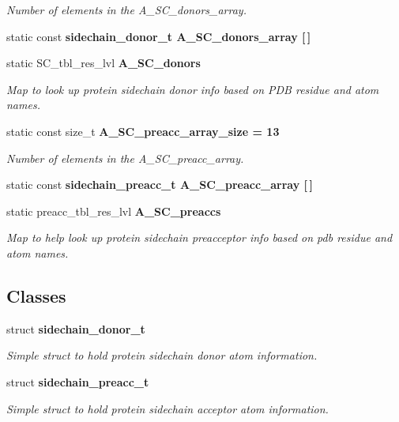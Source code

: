 \begin{CompactItemize}
\begin{CompactList}\small\item\em Number of elements in the A\_\-SC\_\-donors\_\-array. \item\end{CompactList}\item 
static const \bf{sidechain\_\-donor\_\-t} \textbf{A\_\-SC\_\-donors\_\-array} [$\,$]
\item 
static SC\_\-tbl\_\-res\_\-lvl \bf{A\_\-SC\_\-donors}\label{classASCbase_1_1HbondGeometry_41f1ae04adc06ecce1090fc0b29bdb6c}

\begin{CompactList}\small\item\em Map to look up protein sidechain donor info based on PDB residue and atom names. \item\end{CompactList}\item 
static const size\_\-t \bf{A\_\-SC\_\-preacc\_\-array\_\-size} = 13\label{classASCbase_1_1HbondGeometry_db54f5c38c13a2ba3a4e28b41ba8024c}

\begin{CompactList}\small\item\em Number of elements in the A\_\-SC\_\-preacc\_\-array. \item\end{CompactList}\item 
static const \bf{sidechain\_\-preacc\_\-t} \textbf{A\_\-SC\_\-preacc\_\-array} [$\,$]
\item 
static preacc\_\-tbl\_\-res\_\-lvl \bf{A\_\-SC\_\-preaccs}\label{classASCbase_1_1HbondGeometry_0707a6e39cd01a720da5469cc0138af4}

\begin{CompactList}\small\item\em Map to help look up protein sidechain preacceptor info based on pdb residue and atom names. \item\end{CompactList}\end{CompactItemize}
\subsection*{Classes}
\begin{CompactItemize}
\item 
struct \bf{sidechain\_\-donor\_\-t}
\begin{CompactList}\small\item\em Simple struct to hold protein sidechain donor atom information. \item\end{CompactList}\item 
struct \bf{sidechain\_\-preacc\_\-t}
\begin{CompactList}\small\item\em Simple struct to hold protein sidechain acceptor atom information. \item\end{CompactList}\end{CompactItemize}


